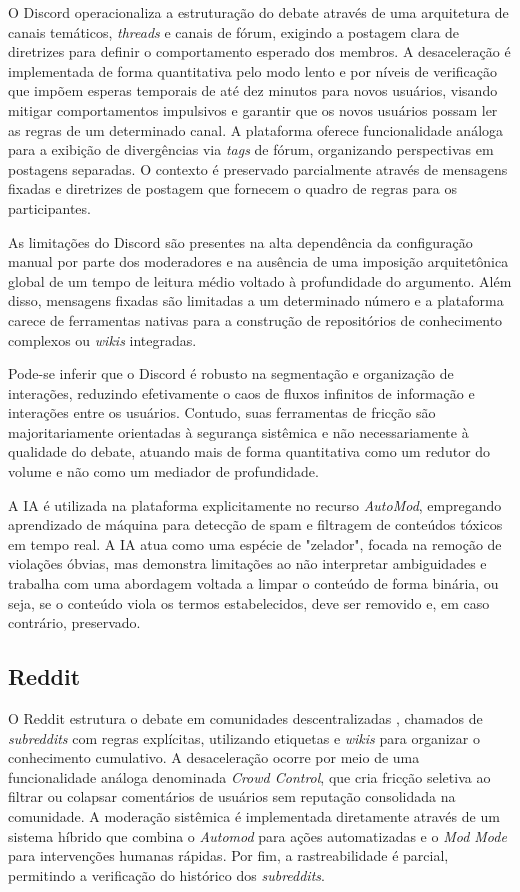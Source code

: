 \documentclass[conference]{IEEEtran} \IEEEoverridecommandlockouts %
\begin{document}
O Discord operacionaliza a estruturação do debate através de uma arquitetura de canais temáticos, \textit{threads} e canais de fórum, exigindo a postagem clara de diretrizes para definir o comportamento esperado dos membros. A desaceleração é implementada de forma quantitativa pelo modo lento e por níveis de verificação que impõem esperas temporais de até dez minutos para novos usuários, visando mitigar comportamentos impulsivos e garantir que os novos usuários possam ler as regras de um determinado canal. A plataforma oferece funcionalidade análoga para a exibição de divergências via \textit{tags} de fórum, organizando perspectivas em postagens separadas. O contexto é preservado parcialmente através de mensagens fixadas e diretrizes de postagem que fornecem o quadro de regras para os participantes.

As limitações do Discord são presentes na alta dependência da configuração manual por parte dos moderadores e na ausência de uma imposição arquitetônica global de um tempo de leitura médio voltado à profundidade do argumento. Além disso, mensagens fixadas são limitadas a um determinado número e a plataforma carece de ferramentas nativas para a construção de repositórios de conhecimento complexos ou \textit{wikis} integradas.

Pode-se inferir que o Discord é robusto na segmentação e organização de interações, reduzindo efetivamente o caos de fluxos infinitos de informação e interações entre os usuários. Contudo, suas ferramentas de fricção são majoritariamente orientadas à segurança sistêmica e não necessariamente à qualidade do debate, atuando mais de forma quantitativa como um redutor do volume e não como um mediador de profundidade.

A IA é utilizada na plataforma explicitamente no recurso \textit{AutoMod}, empregando aprendizado de máquina para detecção de spam e filtragem de conteúdos tóxicos em tempo real. A IA atua como uma espécie de "zelador", focada na remoção de violações óbvias, mas demonstra limitações ao não interpretar ambiguidades e trabalha com uma abordagem voltada a limpar o conteúdo de forma binária, ou seja, se o conteúdo viola os termos estabelecidos, deve ser removido e, em caso contrário, preservado.

\subsection{Reddit}

O Reddit estrutura o debate em comunidades descentralizadas , chamados de \textit{subreddits} com regras explícitas, utilizando etiquetas e \textit{wikis} para organizar o conhecimento cumulativo. A desaceleração ocorre por meio de uma funcionalidade análoga denominada \textit{Crowd Control}, que cria fricção seletiva ao filtrar ou colapsar comentários de usuários sem reputação consolidada na comunidade. A moderação sistêmica é implementada diretamente através de um sistema híbrido que combina o \textit{Automod} para ações automatizadas e o \textit{Mod Mode} para intervenções humanas rápidas. Por fim, a rastreabilidade é parcial, permitindo a verificação do histórico dos \textit{subreddits}.
\end{document}
